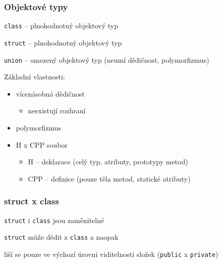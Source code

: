 
\begin{frame}[fragile]
\frametitle{Objektové typy}
\begin{bitemize}
\item \lstinline|class| -- plnohodnotný objektový typ
\item \lstinline|struct| -- plnohodnotný objektový typ
\item \lstinline|union| -- omezený objektový typ (neumí dědičnost, polymorfizmus)
\end{bitemize}

\begin{block}{}
Základní vlastnosti:
\begin{itemize}
\item vícenásobná dědičnost
\begin{itemize}
\item neexistují rozhraní
\end{itemize}

\item polymorfizmus
\item H x CPP soubor
\begin{itemize}
\item H -- deklarace (celý typ, atributy, prototypy metod)
\item CPP -- definice (pouze těla metod, statické atributy)
\end{itemize}
\end{itemize}
\end{block}
\end{frame}


\begin{frame}[fragile]
\frametitle{struct x class}
\begin{bitemize}
\item \lstinline|struct| i \lstinline|class| jsou zaměnitelné
\item \lstinline|struct| může dědit z \lstinline|class| a naopak
\item liší se pouze ve výchozí úrovni viditelnosti složek (\lstinline|public| x \lstinline|private|)
\end{bitemize}
\end{frame}



